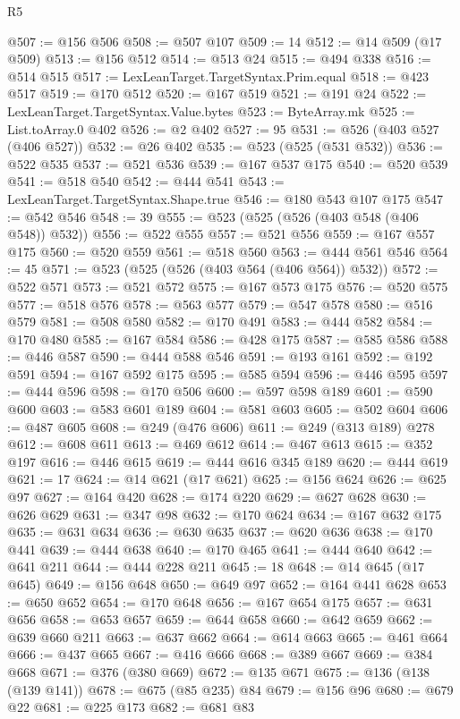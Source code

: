 \begin{lexlean}{R5}
\begin{coremodule}
{{{{{{{{{{{{{{{{{{{{{{{{{{{{{{{{{{{{{{{{{{{{{{{{{{{{{{{{{{{{{{@507 := @156 @506
@508 := @507 @107
@509 := 14
@512 := @14 @509 (@17 @509)
@513 := @156 @512
@514 := @513 @24
@515 := @494 @338
@516 := @514 @515
@517 := LexLeanTarget.TargetSyntax.Prim.equal
@518 := @423 @517
@519 := @170 @512
@520 := @167 @519
@521 := @191 @24
@522 := LexLeanTarget.TargetSyntax.Value.bytes
@523 := ByteArray.mk
@525 := List.toArray.{0} @402
@526 := @2 @402
@527 := 95
@531 := @526 (@403 @527 (@406 @527))
@532 := @26 @402
@535 := @523 (@525 (@531 @532))
@536 := @522 @535
@537 := @521 @536
@539 := @167 @537 @175
@540 := @520 @539
@541 := @518 @540
@542 := @444 @541
@543 := LexLeanTarget.TargetSyntax.Shape.true
@546 := @180 @543 @107 @175
@547 := @542 @546
@548 := 39
@555 := @523 (@525 (@526 (@403 @548 (@406 @548)) @532))
@556 := @522 @555
@557 := @521 @556
@559 := @167 @557 @175
@560 := @520 @559
@561 := @518 @560
@563 := @444 @561 @546
@564 := 45
@571 := @523 (@525 (@526 (@403 @564 (@406 @564)) @532))
@572 := @522 @571
@573 := @521 @572
@575 := @167 @573 @175
@576 := @520 @575
@577 := @518 @576
@578 := @563 @577
@579 := @547 @578
@580 := @516 @579
@581 := @508 @580
@582 := @170 @491
@583 := @444 @582
@584 := @170 @480
@585 := @167 @584
@586 := @428 @175
@587 := @585 @586
@588 := @446 @587
@590 := @444 @588 @546
@591 := @193 @161
@592 := @192 @591
@594 := @167 @592 @175
@595 := @585 @594
@596 := @446 @595
@597 := @444 @596
@598 := @170 @506
@600 := @597 @598 @189
@601 := @590 @600
@603 := @583 @601 @189
@604 := @581 @603
@605 := @502 @604
@606 := @487 @605
@608 := @249 (@476 @606)
@611 := @249 (@313 @189) @278
@612 := @608 @611
@613 := @469 @612
@614 := @467 @613
@615 := @352 @197
@616 := @446 @615
@619 := @444 @616 @345 @189
@620 := @444 @619
@621 := 17
@624 := @14 @621 (@17 @621)
@625 := @156 @624
@626 := @625 @97
@627 := @164 @420
@628 := @174 @220
@629 := @627 @628
@630 := @626 @629
@631 := @347 @98
@632 := @170 @624
@634 := @167 @632 @175
@635 := @631 @634
@636 := @630 @635
@637 := @620 @636
@638 := @170 @441
@639 := @444 @638
@640 := @170 @465
@641 := @444 @640
@642 := @641 @211
@644 := @444 @228 @211
@645 := 18
@648 := @14 @645 (@17 @645)
@649 := @156 @648
@650 := @649 @97
@652 := @164 @441 @628
@653 := @650 @652
@654 := @170 @648
@656 := @167 @654 @175
@657 := @631 @656
@658 := @653 @657
@659 := @644 @658
@660 := @642 @659
@662 := @639 @660 @211
@663 := @637 @662
@664 := @614 @663
@665 := @461 @664
@666 := @437 @665
@667 := @416 @666
@668 := @389 @667
@669 := @384 @668
@671 := @376 (@380 @669)
@672 := @135 @671
@675 := @136 (@138 (@139 @141))
@678 := @675 (@85 @235) @84
@679 := @156 @96
@680 := @679 @22
@681 := @225 @173
@682 := @681 @83
}}}}}}}}}}}}}}}}}}}}}}}}}}}}}}}}}}}}}}}}}}}}}}}}}}}}}}}}}}}}}}
\end{coremodule}
\end{lexlean}
